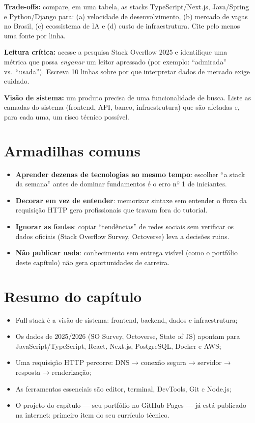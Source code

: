 \begin{seniores}
  \item \textbf{Trade-offs:} compare, em uma tabela, as stacks
  TypeScript/Next.js, Java/Spring e Python/Django para: (a) velocidade de
  desenvolvimento, (b) mercado de vagas no Brasil, (c) ecossistema de IA e
  (d) custo de infraestrutura. Cite pelo menos uma fonte por linha.
  \item \textbf{Leitura crítica:} acesse a pesquisa Stack Overflow 2025 e
  identifique uma métrica que possa \emph{enganar} um leitor apressado (por
  exemplo: ``admirada'' vs.\ ``usada''). Escreva 10 linhas sobre por que
  interpretar dados de mercado exige cuidado.
  \item \textbf{Visão de sistema:} um produto precisa de uma funcionalidade de
  busca. Liste as camadas do sistema (frontend, API, banco, infraestrutura)
  que são afetadas e, para cada uma, um risco técnico possível.
\end{seniores}

\section{Armadilhas comuns}

\begin{itemize}[leftmargin=*, itemsep=0.4em]
  \item \textbf{Aprender dezenas de tecnologias ao mesmo tempo}: escolher
  ``a stack da semana'' antes de dominar fundamentos é o erro nº 1 de iniciantes.
  \item \textbf{Decorar em vez de entender}: memorizar sintaxe sem entender o
  fluxo da requisição HTTP gera profissionais que travam fora do tutorial.
  \item \textbf{Ignorar as fontes}: copiar ``tendências'' de redes sociais sem
  verificar os dados oficiais (Stack Overflow Survey, Octoverse) leva a decisões ruins.
  \item \textbf{Não publicar nada}: conhecimento sem entrega visível (como o
  portfólio deste capítulo) não gera oportunidades de carreira.
\end{itemize}

\section{Resumo do capítulo}

\begin{itemize}[leftmargin=*, itemsep=0.3em]
  \item Full stack é a visão de sistema: frontend, backend, dados e infraestrutura;
  \item Os dados de 2025/2026 (SO Survey, Octoverse, State of JS) apontam para
  JavaScript/TypeScript, React, Next.js, PostgreSQL, Docker e AWS;
  \item Uma requisição HTTP percorre: DNS → conexão segura → servidor → resposta → renderização;
  \item As ferramentas essenciais são editor, terminal, DevTools, Git e Node.js;
  \item O projeto do capítulo — seu portfólio no GitHub Pages — já está
  publicado na internet: primeiro item do seu currículo técnico.
\end{itemize}

